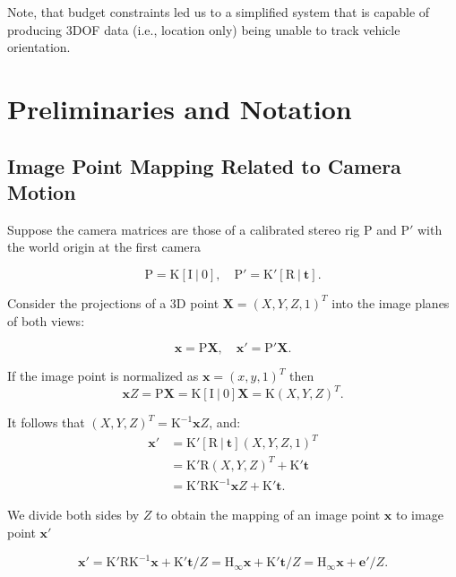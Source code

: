 \documentclass{report}
\begin{document}
Note, that budget constraints led us to a simplified system that is
capable of producing 3DOF data (i.e., location only) being unable to
track vehicle orientation.

\section{Preliminaries and Notation}

\subsection{Image Point Mapping Related to Camera Motion}

Suppose the camera matrices are those of a calibrated stereo rig
$\mathrm{P}$ and $\mathrm{P}'$ with the world origin at the first
camera

\begin{equation}
\mathrm{P = K[I\ |\ 0],\quad P'=K'[R\ |\ \mathbf{t}]}.
\end{equation}

Consider the projections of a 3D point $\mathbf{X}=(X,Y,Z,1)^T$ into the image
planes of both views:

\begin{equation}
\mathrm{\mathbf{x} = P\mathbf{X}, \quad \mathbf{x}' = P'\mathbf{X}}.
\end{equation}

If the image point is normalized as $\mathbf{x} = (x,y,1)^T$ then
\[
\mathbf{x}Z = \mathrm{P\mathbf{X} = K[I\ |\ 0]\mathbf{X} = K}(X,Y,Z)^T.
\]

It follows that $(X,Y,Z)^T = \mathrm{K^{-1}}\mathbf{x}Z$, and:
\begin{align}
  \mathbf{x}' &= \mathrm{K'[R\ |\ \mathbf{t}]}(X,Y,Z,1)^T \\
  &= \mathrm{K'R}(X,Y,Z)^T + \mathrm{K'\mathbf{t}}\\
  &= \mathrm{K'RK^{-1}}\mathbf{x}Z + \mathrm{K'\mathbf{t}}.
\end{align}

We divide both sides by $Z$ to obtain the mapping of an image point $\mathbf{x}$ to image point $\mathbf{x}'$

\begin{equation}
  \label{eq:general_point_motion}
  \mathbf{x}' = \mathrm{K'RK^{-1}}\mathbf{x} + \mathrm{K'}\mathbf{t}/Z = \mathrm{H_\infty}\mathbf{x}+ \mathrm{K'}\mathbf{t}/Z = \mathrm{H_\infty}\mathbf{x} + \mathbf{e'}/Z.
\end{equation}
\end{document}
